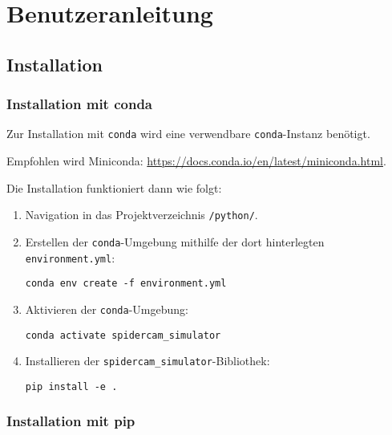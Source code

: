 \section{Benutzeranleitung}
\label{sec:benutzeranleitung}

\subsection{Installation}
\label{ssec:installation}

\subsubsection{Installation mit conda}
\label{sssec:installation_mit_conda}

Zur Installation mit \texttt{conda} wird eine verwendbare \texttt{conda}-Instanz benötigt.

Empfohlen wird Miniconda: \url{https://docs.conda.io/en/latest/miniconda.html}.

Die Installation funktioniert dann wie folgt:
\begin{enumerate}
    \item Navigation in das Projektverzeichnis \texttt{/python/}.
    \item Erstellen der \texttt{conda}-Umgebung mithilfe der dort hinterlegten \texttt{environment.yml}:
          \begin{center}
              \texttt{conda env create -f environment.yml}
          \end{center}
    \item Aktivieren der \texttt{conda}-Umgebung:
          \begin{center}
              \texttt{conda activate spidercam\_simulator}
          \end{center}
    \item Installieren der \texttt{spidercam\_simulator}-Bibliothek:
          \begin{center}
              \texttt{pip install -e .}
          \end{center}
\end{enumerate}


\subsubsection{Installation mit pip}
\label{sssec:installation_mit_pip}

